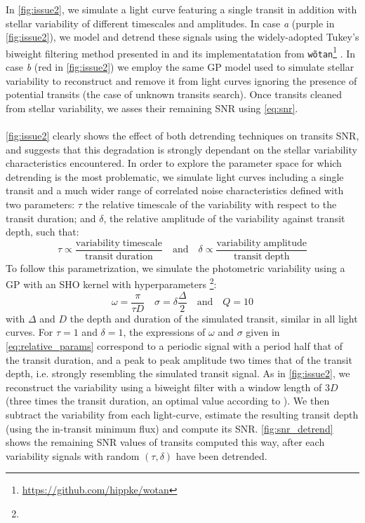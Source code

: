 \documentclass{aastex631}
\begin{document}
In \autoref{fig:issue2}, we simulate a light curve featuring a single transit in addition with stellar variability of different timescales and amplitudes. In case \textit{a} (purple in \autoref{fig:issue2}), we model and detrend these signals using the widely-adopted Tukey's biweight filtering method presented in \citealt{tukey} and its implementatation from \texttt{wõtan}\footnote{\href{https://github.com/hippke/wotan}{https://github.com/hippke/wotan}} \citep{wotan}. In case \textit{b} (red in \autoref{fig:issue2}) we employ the same GP model used to simulate stellar variability to reconstruct and remove it from light curves ignoring the presence of potential transits (the case of unknown transits search). Once transits cleaned from stellar variability, we asses their remaining SNR using \autoref{eq:snr}.
\\\\
\autoref{fig:issue2} clearly shows the effect of both detrending techniques on transits SNR, and suggests that this degradation is strongly dependant on the stellar variability characteristics encountered. In order to explore the parameter space for which detrending is the most problematic, we simulate light curves including a single transit and a much wider range of correlated noise characteristics defined with two parameters: $\tau$ the relative timescale of the variability with respect to the transit duration; and $\delta$, the relative amplitude of the variability against transit depth, such that:
\begin{equation}
    \tau \propto \frac{\mathrm{variability\; timescale}}{\mathrm{transit\;duration}} \quad \text{and} \quad 
    \delta \propto \frac{\mathrm{variability\; amplitude}}{\mathrm{transit\;depth}} 
\end{equation}
To follow this parametrization, we simulate the photometric variability using a GP with an SHO kernel with hyperparameters \footnote{}:
\begin{equation}\label{eq:relative_params}
    \omega = \frac{\pi}{\tau D} \quad 
    \sigma = \delta \frac{\Delta}{2} \quad  \text{and}  \quad  
    Q = 10
\end{equation}
with $\Delta$ and $D$ the depth and duration of the simulated transit, similar in all light curves. 
For $\tau=1$ and $\delta=1$, the expressions of $\omega$ and $\sigma$ given in \autoref{eq:relative_params} correspond to a periodic signal with a period half that of the transit duration, and a peak to peak amplitude two times that of the transit depth, i.e. strongly resembling the simulated transit signal. As in \autoref{fig:issue2}, we reconstruct the variability using a biweight filter with a window length of $3D$ (three times the transit duration, an optimal value according to \citealt{wotan}). We then subtract the variability from each light-curve, estimate the resulting transit depth (using the in-transit minimum flux) and compute its SNR. \autoref{fig:snr_detrend} shows the remaining SNR values of transits computed this way, after each variability signals with random $(\tau, \delta)$ have been detrended.
\end{document}
